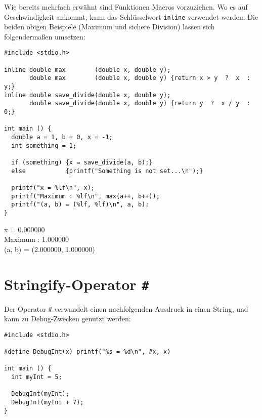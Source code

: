\begin{hintbox}
Wie bereits mehrfach erwähnt sind Funktionen Macros vorzuziehen. Wo es auf Geschwindigkeit ankommt, kann das Schlüsselwort \texttt{inline} verwendet werden. Die beiden obigen Beispiele (Maximum und sichere Division) lassen sich folgendermaßen umsetzen:

\begin{codebox}
\begin{verbatim}
#include <stdio.h>

inline double max        (double x, double y);
       double max        (double x, double y) {return x > y  ?  x  :  y;}
inline double save_divide(double x, double y);
       double save_divide(double x, double y) {return y  ?  x / y  :  0;}

int main () {
  double a = 1, b = 0, x = -1;
  int something = 1;
  
  if (something) {x = save_divide(a, b);}
  else           {printf("Something is not set...\n");}
  
  printf("x = %lf\n", x);
  printf("Maximum : %lf\n", max(a++, b++));
  printf("(a, b) = (%lf, %lf)\n", a, b);
}
\end{verbatim}
\end{codebox}

\begin{cmdbox}
x = 0.000000\\
Maximum : 1.000000\\
(a, b) = (2.000000, 1.000000)
\end{cmdbox}

\end{hintbox}

\section{Stringify-Operator \texttt{\#}}
Der Operator \texttt{\#} verwandelt einen nachfolgenden Ausdruck in einen String, und kann zu Debug-Zwecken genutzt werden:

\begin{codebox}
\begin{verbatim}
#include <stdio.h>

#define DebugInt(x) printf("%s = %d\n", #x, x)

int main () {
  int myInt = 5;

  DebugInt(myInt);
  DebugInt(myInt + 7);
}
\end{verbatim}
\end{codebox}

